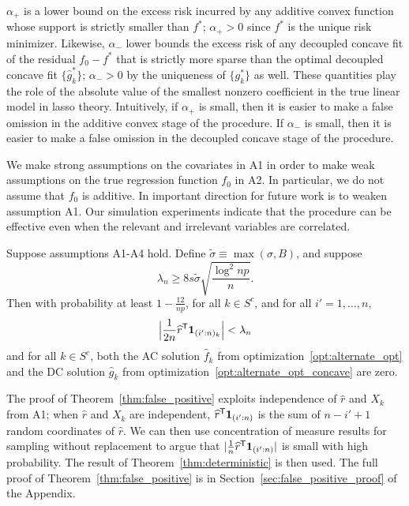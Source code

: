 $\alpha_+$ is a lower bound on the excess risk incurred by any additive convex function whose support is strictly smaller than $f^*$; $\alpha_+ > 0$ since $f^*$ is the unique risk minimizer. Likewise, $\alpha_-$ lower bounds the excess risk of any decoupled concave fit of the residual $f_0 - f^*$ that is strictly more sparse than the optimal decoupled concave fit $\{\hat{g}_k^*\}$; $\alpha_- > 0$ by the uniqueness of $\{g^*_k\}$ as well. These quantities play the role of the absolute value of the smallest nonzero coefficient in the true linear model in lasso theory.  Intuitively, if
$\alpha_{+}$ is small, then it is easier to make a false omission in the
additive convex stage of the procedure. If $\alpha_{-}$ is small, then
it is easier to make a false omission in the decoupled concave stage
of the procedure.

\begin{remark}
  We make strong assumptions on the covariates in A1 in order to make
  weak assumptions on the true regression function $f_0$ in
  A2. In particular, we do not assume that $f_0$ is additive. In
  important direction for future work is to weaken assumption A1.
  Our simulation experiments indicate that the procedure can be
  effective even when the relevant and irrelevant variables are correlated.
\end{remark}


\begin{theorem}
\label{thm:false_positive}
Suppose assumptions A1-A4 hold. Define $\tilde{\sigma} \equiv \max(\sigma, B)$,
and suppose 
\begin{equation}
\lambda_n \geq 8 s \tilde{\sigma}  \sqrt{ \frac{\log^2 np}{n}}.
\end{equation}  
Then with probability at least $ 1 - \frac{12}{np}$, for all $k \in
S^c$, and for all $i'=1,\ldots, n$,
\begin{equation}
\Big| \frac{1}{2n}\widehat{r}^{\mathsf{T}} \mbox{\boldmath $1$}_{(i':n)_k} \Big| < \lambda_n
\end{equation}
and for all $k \in S^c$, both the AC solution $\hat{f}_k$ from optimization~\eqref{opt:alternate_opt} and the DC solution $\hat{g}_k$ from optimization~\eqref{opt:alternate_opt_concave} are zero. 
\end{theorem}

The proof of Theorem~\ref{thm:false_positive} exploits independence of
$\hat{r}$ and $X_k$ from A1; when $\hat{r}$ and $X_k$ are independent,
$\widehat{r}^{\mathsf{T}} \mbox{\boldmath $1$}_{(i':n)}$ is the sum of $n - i' +1$ random
coordinates of $\hat{r}$.  We can then use concentration of
measure results for sampling without replacement to argue that $|
\frac{1}{n} \widehat{r}^{\mathsf{T}}\mbox{\boldmath $1$}_{(i':n)}|$ is small with high
probability. The result of Theorem~\ref{thm:deterministic} is then
used. The full proof of Theorem~\ref{thm:false_positive} is in
Section~\ref{sec:false_positive_proof} of the Appendix.

